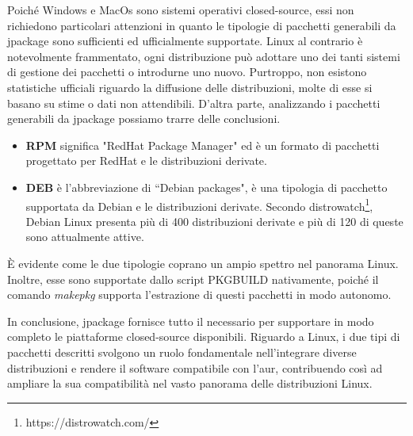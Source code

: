 Poiché Windows e MacOs sono sistemi operativi closed-source, essi non richiedono particolari attenzioni in quanto le tipologie di pacchetti generabili da jpackage sono sufficienti ed ufficialmente supportate. Linux al contrario è notevolmente frammentato, ogni distribuzione può adottare uno dei tanti sistemi di gestione dei pacchetti o introdurne uno nuovo. Purtroppo, non esistono statistiche ufficiali riguardo la diffusione delle distribuzioni, molte di esse si basano su stime o dati non attendibili. D'altra parte, analizzando i pacchetti generabili da jpackage possiamo trarre delle conclusioni.
\begin{itemize}
	\item \textbf{RPM} significa "RedHat Package Manager" ed è un formato di pacchetti progettato per RedHat e le distribuzioni derivate. 
	\item \textbf{DEB} è l'abbreviazione di ``Debian packages", è una tipologia di pacchetto supportata da Debian e le distribuzioni derivate. Secondo distrowatch\footnote{https://distrowatch.com/}, Debian Linux presenta più di 400 distribuzioni derivate e più di 120 di queste sono attualmente attive.
\end{itemize}
È evidente come le due tipologie coprano un ampio spettro nel panorama Linux. Inoltre, esse sono supportate dallo script PKGBUILD nativamente, poiché il comando \textit{makepkg} supporta l'estrazione di questi pacchetti in modo autonomo. 

In conclusione, jpackage fornisce tutto il necessario per supportare in modo completo le piattaforme closed-source disponibili. Riguardo a Linux, i due tipi di pacchetti descritti svolgono un ruolo fondamentale nell'integrare diverse distribuzioni e rendere il software compatibile con l'\ac{aur}, contribuendo così ad ampliare la sua compatibilità nel vasto panorama delle distribuzioni Linux.

